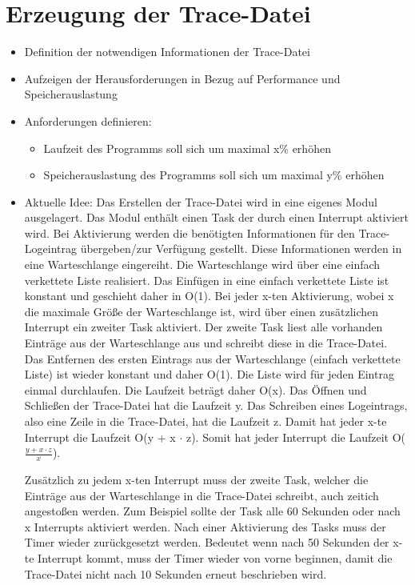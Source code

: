 \section{Erzeugung der Trace-Datei}
\label{section:Erzeugung der Trace-Datei}
\begin{itemize}
    \item Definition der notwendigen Informationen der Trace-Datei
    \item Aufzeigen der Herausforderungen in Bezug auf Performance und
    Speicherauslastung
  \item Anforderungen definieren:
  \begin{itemize}
    \item Laufzeit des Programms soll sich um maximal x\% erhöhen
    \item Speicherauslastung des Programms soll sich um maximal y\% erhöhen
  \end{itemize}
    \item Aktuelle Idee:
    Das Erstellen der Trace-Datei wird in eine eigenes Modul ausgelagert. Das Modul enthält einen Task der durch einen Interrupt aktiviert wird.
    Bei Aktivierung werden die benötigten Informationen für den Trace-Logeintrag übergeben/zur Verfügung gestellt.
    Diese Informationen werden in eine Warteschlange eingereiht. Die Warteschlange wird über eine einfach verkettete Liste realisiert.
    Das Einfügen in eine einfach verkettete Liste ist konstant und geschieht daher in O(1).
    Bei jeder x-ten Aktivierung, wobei x die maximale Größe der Warteschlange ist, wird über einen zusätzlichen Interrupt ein zweiter Task aktiviert.
    Der zweite Task liest alle vorhanden Einträge aus der Warteschlange aus und schreibt diese in die Trace-Datei.
    Das Entfernen des ersten Eintrags aus der Warteschlange (einfach verkettete Liste) ist wieder konstant und daher O(1). Die Liste wird für jeden Eintrag einmal durchlaufen.
    Die Laufzeit beträgt daher O(x). Das Öffnen und Schließen der Trace-Datei hat die Laufzeit y.
    Das Schreiben eines Logeintrags, also eine Zeile in die Trace-Datei, hat die Laufzeit z.
    Damit hat jeder x-te Interrupt die Laufzeit O(y + x $\cdot$ z). Somit hat jeder Interrupt die Laufzeit O($\frac{y + x \cdot z}{x}$).

    Zusätzlich zu jedem x-ten Interrupt muss der zweite Task, welcher die Einträge aus der Warteschlange in die Trace-Datei schreibt, auch zeitich angestoßen werden.
    Zum Beispiel sollte der Task alle 60 Sekunden oder nach x Interrupts aktiviert werden. Nach einer Aktivierung des Tasks muss der Timer wieder zurückgesetzt werden.
    Bedeutet wenn nach 50 Sekunden der x-te Interrupt kommt, muss der Timer wieder von vorne beginnen, damit die Trace-Datei nicht nach 10 Sekunden erneut beschrieben wird.


\end{itemize}
